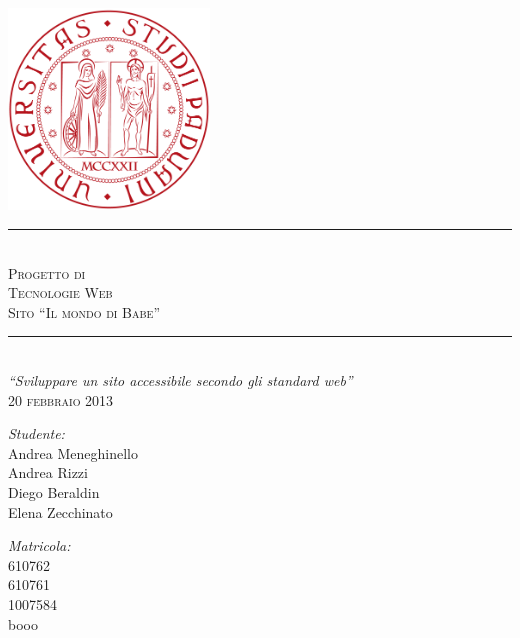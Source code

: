 \documentclass[10pt,a4paper,onecolumn]{article}
\begin{document}
\begin{titlepage}

\begin{center}
 
\textsc{\Large}\\[5cm]

\includegraphics[width=0.4\textwidth]{Logo.png}\\[0.3cm]  
\noindent\rule{\textwidth}{0.4pt} \\[0.3cm]
\textsc{\Huge Progetto di}\\[0.25cm]
\textsc{\Huge Tecnologie Web}\\[0.3cm]
\textsc{\Large Sito ``Il mondo di Babe''}
\noindent\rule{\textwidth}{0.4pt}\\[0.5cm]
\textit{``Sviluppare un sito accessibile secondo gli standard web''} \\[0.5cm]
\textsc{20 febbraio 2013}\\[0.5cm]
\begin{minipage}{0.4\textwidth}
\begin{flushleft} \large
\emph{Studente:}\\
Andrea Meneghinello\\
Andrea Rizzi\\
Diego Beraldin\\
Elena Zecchinato
\end{flushleft}
\end{minipage}
\begin{minipage}{0.4\textwidth}
\begin{flushright} \large
\emph{Matricola:} \\
610762\\
610761\\
1007584\\
booo\\
\end{flushright}
\end{minipage}
\end{center}
\end{titlepage}
\end{document}
